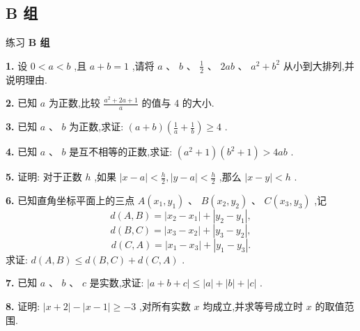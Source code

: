 \documentclass[a4paper,10pt,oneside,fontset=none]{ctexbook}
\renewcommand{\geq}{\geqslant}
\renewcommand{\leq}{\leqslant}
\newenvironment{exercise}[1][]{\begin{exBox}{练习}{#1}}{\end{exBox}}
\numberwithin{equation}{chapter}
\begin{document}
\subsection*{B 组}

\begin{exercise}
\textbf{B 组}\par\vspace{0.5em}
\textbf{1.} 设 $0 < a < b$ ,且 $a + b = 1$ ,请将 $a\text{ 、 }b\text{ 、 }\frac{1}{2}\text{ 、 }{2ab}\text{ 、 }{a}^{2} + {b}^{2}$ 从小到大排列,并说明理由.
\par\vspace{0.8em}
\textbf{2.} 已知 $a$ 为正数,比较 $\frac{{a}^{2} + {2a} + 1}{a}$ 的值与 4 的大小.
\par\vspace{0.8em}
\textbf{3.} 已知 $a\text{ 、 }b$ 为正数,求证: $\left( {a + b}\right) \left( {\frac{1}{a} + \frac{1}{b}}\right)  \geq  4$ .
\par\vspace{0.8em}
\textbf{4.} 已知 $a\text{ 、 }b$ 是互不相等的正数,求证: $\left( {{a}^{2} + 1}\right) \left( {{b}^{2} + 1}\right)  > {4ab}$ .
\par\vspace{0.8em}
\textbf{5.} 证明: 对于正数 $h$ ,如果 $\left| {x - a}\right|  < \frac{h}{2},\left| {y - a}\right|  < \frac{h}{2}$ ,那么 $\left| {x - y}\right|  < h$ .
\par\vspace{0.8em}
\textbf{6.} 已知直角坐标平面上的三点 $A\left( {{x}_{1},{y}_{1}}\right) \text{ 、 }B\left( {{x}_{2},{y}_{2}}\right) \text{ 、 }C\left( {{x}_{3},{y}_{3}}\right)$ ,记 $$
d\left( {A, B}\right)  = \left| {{x}_{2} - {x}_{1}}\right|  + \left| {{y}_{2} - {y}_{1}}\right| ,
$$ $$
d\left( {B, C}\right)  = \left| {{x}_{3} - {x}_{2}}\right|  + \left| {{y}_{3} - {y}_{2}}\right| ,
$$ $$
d\left( {C, A}\right)  = \left| {{x}_{1} - {x}_{3}}\right|  + \left| {{y}_{1} - {y}_{3}}\right| .
$$ 求证: $d\left( {A, B}\right)  \leq  d\left( {B, C}\right)  + d\left( {C, A}\right)$ .
\par\vspace{0.8em}
\textbf{7.} 已知 $a\text{ 、 }b\text{ 、 }c$ 是实数,求证: $\left| {a + b + c}\right|  \leq  \left| a\right|  + \left| b\right|  + \left| c\right|$ .
\par\vspace{0.8em}
\textbf{8.} 证明: $\left| {x + 2}\right|  - \left| {x - 1}\right|  \geq   - 3$ ,对所有实数 $x$ 均成立,并求等号成立时 $x$ 的取值范围.
\end{exercise}
\end{document}
